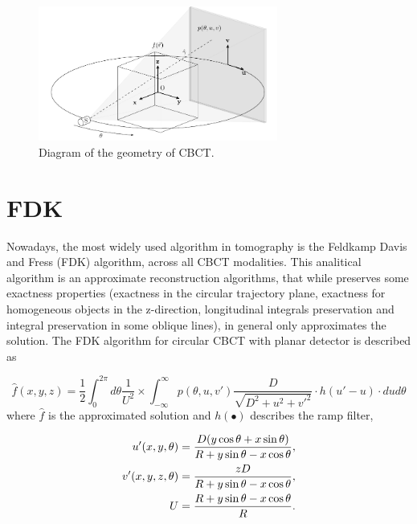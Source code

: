 \begin{figure}[H]
\begin{center}

\includegraphics[width=0.7\textwidth]{RecAlgorithms/geo.pdf} 
\end{center}

\caption[Diagram of the geometry of CBCT]{\label{fig:geo} Diagram of the geometry of CBCT.} 
\end{figure}


\section{FDK}\label{sec:FDK}
Nowadays, the most widely used algorithm in tomography is the Feldkamp Davis and Fress (FDK) algorithm\cite{Feldkamp1984}, across all CBCT modalities. This analitical algorithm is an approximate reconstruction algorithms, that while preserves some exactness properties (exactness in the circular trajectory plane\cite{Feldkamp1984}, exactness for homogeneous objects in the z-direction, longitudinal integrals preservation and integral preservation in some oblique lines\cite{li2006general}), in general only approximates the solution. The FDK algorithm for circular CBCT with planar detector is described as

\begin{equation}
\hat{f}(x,y,z)=\frac{1}{2}\int_{0}^{2\pi}d\theta \frac{1}{U^2} \times \int_{-\infty}^{\infty}p(\theta,u,v') \frac{D}{\sqrt{D^2+u^2+v'^2}} \cdot h(u'-u)\cdot dud\theta
\end{equation}
where $\hat{f}$ is the approximated solution and $h(\bullet)$ describes the ramp filter, 

\begin{align}
u'(x,y,\theta)&=\frac{D(y\cos\theta+x\sin\theta)}{R+y\sin\theta-x\cos\theta},\notag\\
v'(x,y,z,\theta)&=\frac{zD}{R+y\sin\theta-x\cos\theta},\notag\\
U&=\frac{R+y\sin\theta-x\cos\theta}{R}.
\label{eq:weigth}
\end{align}


